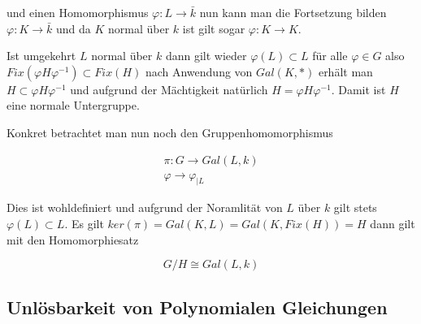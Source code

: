 \documentclass{report}
\begin{document}
{und einen Homomorphismus $\varphi: L \to \bar{k}$ nun kann man die Fortsetzung bilden $\varphi: K \to  \bar{k}$ und da $K$ normal über $k$ ist gilt sogar $\varphi: K \to K$.

Ist umgekehrt $L$ normal über $k$ dann gilt wieder $\varphi(L) \subset L$ für alle $\varphi \in G$ also $Fix(\varphi H \varphi^{-1}) \subset Fix(H)$  nach Anwendung von $Gal(K,*)$ erhält man $H \subset \varphi H \varphi^{-1}$ und aufgrund der Mächtigkeit natürlich $H = \varphi H \varphi^{-1}$. Damit ist $H$ eine normale Untergruppe.

Konkret betrachtet man nun noch den Gruppenhomomorphismus

\begin{align}
    \pi: G \to Gal(L,k) \\
    \varphi \to \varphi_{|L}
\end{align}

Dies ist wohldefiniert und aufgrund der Noramlität von $L$ über  $k$ gilt stets $\varphi(L) \subset L$. Es gilt $ker(\pi)=Gal(K,L)=Gal(K,Fix(H))=H$ dann gilt mit den Homomorphiesatz

\begin{equation}
    G/H \cong Gal(L,k)
\end{equation}
}

\subsection{Unlösbarkeit von Polynomialen Gleichungen} %
\label{sub:unlösbarkeit_von_polynomialen_gleichungen}


\end{document}
